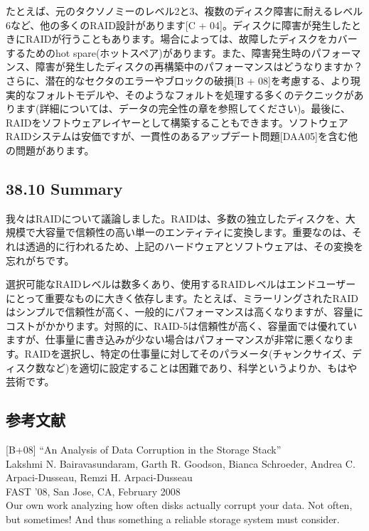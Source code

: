 たとえば、元のタクソノミーのレベル2と3、複数のディスク障害に耐えるレベル6など、他の多くのRAID設計があります{[}C
+
04{]}。ディスクに障害が発生したときにRAIDが行うこともあります。場合によっては、故障したディスクをカバーするためのhot
spare(ホットスペア)があります。また、障害発生時のパフォーマンス、障害が発生したディスクの再構築中のパフォーマンスはどうなりますか？さらに、潜在的なセクタのエラーやブロックの破損{[}B
+
08{]}を考慮する、より現実的なフォルトモデルや、そのようなフォルトを処理する多くのテクニックがあります(詳細については、データの完全性の章を参照してください)。最後に、RAIDをソフトウェアレイヤーとして構築することもできます。ソフトウェアRAIDシステムは安価ですが、一貫性のあるアップデート問題{[}DAA05{]}を含む他の問題があります。

\hypertarget{summary-25}{%
\subsection*{38.10 Summary}\label{summary-25}}

我々はRAIDについて議論しました。RAIDは、多数の独立したディスクを、大規模で大容量で信頼性の高い単一のエンティティに変換します。重要なのは、それは透過的に行われるため、上記のハードウェアとソフトウェアは、その変換を忘れがちです。

選択可能なRAIDレベルは数多くあり、使用するRAIDレベルはエンドユーザーにとって重要なものに大きく依存します。たとえば、ミラーリングされたRAIDはシンプルで信頼性が高く、一般的にパフォーマンスは高くなりますが、容量にコストがかかります。対照的に、RAID-5は信頼性が高く、容量面では優れていますが、仕事量に書き込みが少ない場合はパフォーマンスが非常に悪くなります。RAIDを選択し、特定の仕事量に対してそのパラメータ(チャンクサイズ、ディスク数など)を適切に設定することは困難であり、科学というよりか、もはや芸術です。

\hypertarget{ux53c2ux8003ux6587ux732e-25}{%
\subsection*{参考文献}\label{ux53c2ux8003ux6587ux732e-25}}

{[}B+08{]} ``An Analysis of Data Corruption in the Storage Stack''\\
Lakshmi N. Bairavasundaram, Garth R. Goodson, Bianca Schroeder, Andrea
C. Arpaci-Dusseau, Remzi H. Arpaci-Dusseau\\
FAST '08, San Jose, CA, February 2008\\
Our own work analyzing how often disks actually corrupt your data. Not
often, but sometimes! And thus something a reliable storage system must
consider.

